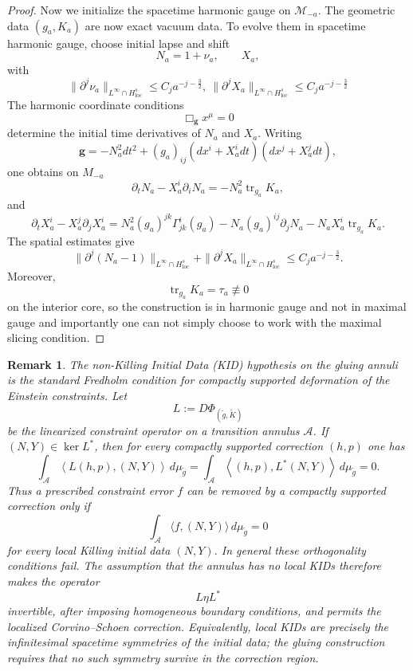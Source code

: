 \documentclass{amsart}
\newtheorem{remark}{Remark}
\begin{document}
{\begin{proof}
\noindent Now we initialize the spacetime harmonic gauge on $\mathcal{M}_{-a}$.
The geometric data \((g_a,K_a)\) are now exact vacuum data. To evolve
them in spacetime harmonic gauge, choose initial lapse and shift
\[
        N_a=1+\nu_a,
        \qquad
        X_a,
\]
with
\[
        \|\partial^j\nu_a\|_{L^\infty\cap H^s_{\mathrm{loc}}}
        \le
        C_j a^{-j-\frac32},~\|\partial^j X_{a}\|_{L^\infty\cap H^s_{\mathrm{loc}}}
        \le
        C_j a^{-j-\frac32}
\]
The harmonic coordinate conditions
\[
        \Box_{\mathbf g}x^\mu=0
\]
determine the initial time derivatives of \(N_a\) and \(X_a\). Writing
\[
        \mathbf g
        =
        -N_a^2dt^2
        +
        (g_a)_{ij}(dx^i+X_a^idt)(dx^j+X_a^jdt),
\]
one obtains on \(M_{-a}\)
\[
        \partial_tN_a-X_a^i\partial_iN_a
        =
        -N_a^2\operatorname{tr}_{g_a}K_a,
\]
and
\[
        \partial_tX_a^i-X_a^j\partial_jX_a^i
        =
        N_a^2(g_a)^{jk}\Gamma^i_{jk}(g_a)
        -
        N_a(g_a)^{ij}\partial_jN_a
        -
        N_aX_a^i\operatorname{tr}_{g_a}K_a.
\]
The spatial estimates give
\[
        \|\partial^j(N_a-1)\|_{L^\infty\cap H^s_{\mathrm{loc}}}
        +
        \|\partial^jX_a\|_{L^\infty\cap H^s_{\mathrm{loc}}}
        \le
        C_j a^{-j-\frac32}.
\]
Moreover,
\[
        \operatorname{tr}_{g_a}K_a=\tau_a\not\equiv0
\]
on the interior core, so the construction is in harmonic gauge and not
in maximal gauge and importantly one can not simply choose to work with the maximal slicing condition.


\end{proof}


\begin{remark}
The non-Killing Initial Data (KID) hypothesis on the gluing annuli is the standard Fredholm
condition for compactly supported deformation of the Einstein
constraints. Let
\[
        L:=D\Phi_{(\widetilde g,\widetilde K)}
\]
be the linearized constraint operator on a transition annulus
\(\mathcal A\). If \((N,Y)\in\ker L^*\), then for every compactly
supported correction \((h,p)\) one has
\[
        \int_{\mathcal A}
        \left\langle L(h,p),(N,Y)\right\rangle\,d\mu_{\widetilde g}
        =
        \int_{\mathcal A}
        \left\langle (h,p),L^*(N,Y)\right\rangle\,d\mu_{\widetilde g}
        =
        0 .
\]
Thus a prescribed constraint error \(f\) can be removed by a compactly
supported correction only if
\[
        \int_{\mathcal A}\langle f,(N,Y)\rangle\,d\mu_{\widetilde g}=0
\]
for every local Killing initial data  \((N,Y)\). In general these orthogonality
conditions fail. The assumption that the annulus has no local KIDs
therefore makes the operator
\[
        L\eta L^*
\]
invertible, after imposing homogeneous boundary conditions, and permits
the localized Corvino--Schoen correction. Equivalently, local KIDs
are precisely the infinitesimal spacetime symmetries of the initial
data; the gluing construction requires that no such symmetry survive in
the correction region.
\end{remark}




}
\end{document}

